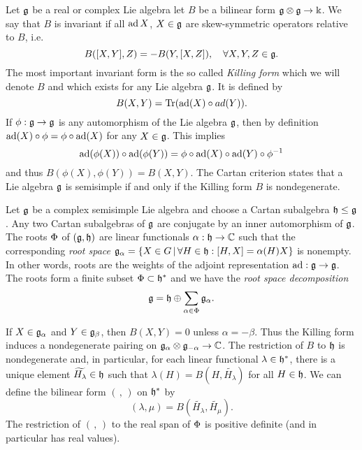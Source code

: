 Let $\mathfrak{g}$ be a real or complex Lie algebra let $B$ be a bilinear form $\mathfrak{g}\otimes \mathfrak{g} \to \Bbbk$. We say that $B$ is invariant if all $\operatorname{\mathrm{ad}} X$, $X\in\mathfrak{g}$ are skew-symmetric operators relative to $B$, i.e.
\[
 B([X,Y],Z) = -B(Y,[X,Z]), \quad \forall X,Y,Z \in \mathfrak{g}.
\]
The most important invariant form is the so called \emph{Killing form} which we will denote $B$ and which exists for any Lie algebra $\mathfrak{g}$. It is defined by
\[
 B(X,Y) = \operatorname{\mathrm{Tr}}(\operatorname{\mathrm{ad}}(X) \circ ad(Y)).
\]
If $\phi:\mathfrak{g} \to \mathfrak{g}$ is any automorphism of the Lie algebra $\mathfrak{g}$, then by definition $\operatorname{\mathrm{ad}}(X) \circ \phi = \phi \circ \operatorname{\mathrm{ad}}(X)$ for any $X\in\mathfrak{g}$. This implies
\[
 \operatorname{\mathrm{ad}}(\phi(X)) \circ \operatorname{\mathrm{ad}}(\phi(Y)) = \phi \circ \operatorname{\mathrm{ad}}(X)\circ\operatorname{\mathrm{ad}}(Y)\circ\phi^{-1}
\]
and thus $B(\phi(X),\phi(Y)) = B(X,Y)$. The Cartan criterion states that a Lie algebra $\mathfrak{g}$ is semisimple if and only if the Killing form $B$ is nondegenerate.


Let $\mathfrak{g}$ be a complex semisimple Lie algebra and choose a Cartan subalgebra $\mathfrak{h} \leq \mathfrak{g}$. Any two Cartan subalgebras of $\mathfrak{g}$ are conjugate by an inner automorphism of $\mathfrak{g}$. The roots $\Phi$ of $(\mathfrak{g},\mathfrak{h})$ are linear functionals $\alpha: \mathfrak{h} \to \mathbb{C}$ such that the corresponding \emph{root space} $\mathfrak{g}_\alpha = \{ X\in G \,|\,\forall H\in \mathfrak{h}: [H,X] = \alpha(H) X \}$ is nonempty. In other words, roots are the weights of the adjoint representation $\operatorname{\mathrm{ad}}:\mathfrak{g}\to\mathfrak{g}$. The roots form a finite subset $\Phi \subset \mathfrak{h}^*$ and we have the \emph{root space decomposition}
\[
 \mathfrak{g} = \mathfrak{h} \oplus \sum_{\alpha \in \Phi} \mathfrak{g}_\alpha.
\]

If $X\in\mathfrak{g}_\alpha$ and $Y\in\mathfrak{g}_\beta$, then $B(X,Y) = 0$ unless $\alpha = -\beta$. Thus the Killing form induces a nondegenerate pairing on $\mathfrak{g}_\alpha \otimes \mathfrak{g}_{-\alpha}\to \mathbb{C}$. The restriction of $B$ to $\mathfrak{h}$ is nondegenerate and, in particular, for each linear functional $\lambda \in \mathfrak{h}^*$, there is a unique
 element $\widetilde{H_\lambda} \in \mathfrak{h}$ such that $\lambda(H) = B(H,\widetilde{H_\lambda})$ for all $H\in\mathfrak{h}$. We can define the bilinear form $(\, , \,)$ on $\mathfrak{h}^*$ by
\[
 (\lambda,\mu) = B(\widetilde{H_\lambda}, \widetilde{H_\mu}).
\]
The restriction of $(\, , \, )$ to the real span of $\Phi$ is positive definite (and in particular has real values).

